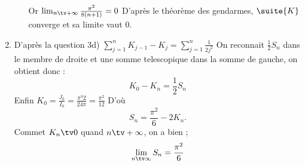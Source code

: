 \documentclass[a4paper, 11pt,reqno]{article}
\begin{document}
\begin{correction}
\begin{enumerate}
\begin{enumerate}
Or $\lim_{n\tv +\infty}  \frac{\pi^2}{8(n+1)} =0$ 
D'après le théorème des gendarmes, $\suite{K}$ converge et sa limite vaut $0$. 

\end{enumerate}
\item D'après la question 3d)  $\sum_{j=1}^n  K_{j-1} -K_j =\sum_{j=1}^n \frac{1}{2 j^2}$
On reconnait $\frac{1}{2}S_n$ dans le membre de droite et une somme telescopique dans la somme de gauche, on obtient donc : 
$$K_{0}-K_n =\frac{1}{2} S_n$$
Enfin $K_0 =\frac{J_0}{I_0} = \frac{\pi^3 2}{24 \pi} = \frac{\pi^2}{12}$
D'où 
$$S_n = \frac{\pi^2}{6} -2K_n.$$
Commet $K_n\tv 0$ quand $n\tv +\infty$, on  a bien ; 
$$ \lim_{n\tv \infty} S_n  =\frac{\pi^2}{6}$$




\end{enumerate}
\end{correction}
\end{document}
